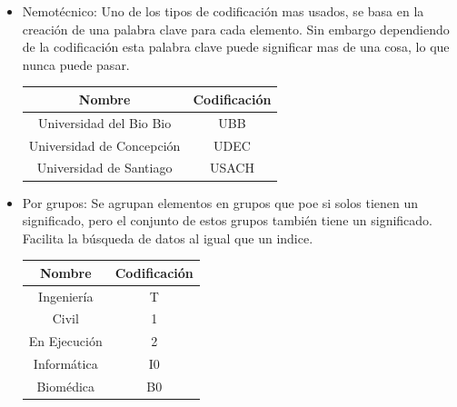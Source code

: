 \documentclass{templateNote}
\begin{document}
\begin{enumerate}
\begin{itemize}
\begin{itemize}
\begin{tcolorbox}[colback=green!10!white,colframe=green!75!black,title=Ejemplo de codificación de consonantes]
                \end{tcolorbox}
                \item Nemotécnico: Uno de los tipos de codificación mas usados, se basa en la creación de una palabra clave para cada elemento.
                Sin embargo dependiendo de la codificación esta palabra clave puede significar mas de una cosa, lo que nunca puede pasar.
                \begin{tcolorbox}[colback=green!10!white,colframe=green!75!black,title=Ejemplo de codificación Nemotécnica]
                    \begin{center}
                        \begin{tabular}{|c|c|}
                            \hline
                            \textbf{Nombre} & \textbf{Codificación} \\ \hline
                            Universidad del Bio Bio & UBB \\ \hline
                            Universidad de Concepción & UDEC \\ \hline
                            Universidad de Santiago & USACH \\ \hline
                        \end{tabular}
                    \end{center}
                \end{tcolorbox}
                \item Por grupos: Se agrupan elementos en grupos que poe si solos tienen un significado, pero el conjunto de estos grupos también tiene un significado. Facilita la búsqueda de datos al igual que un indice.
                \begin{tcolorbox}[colback=green!10!white,colframe=green!75!black,title=Ejemplo de codificación Por grupos]
                    \begin{center}
                        \begin{tabular}{|c|c|}
                            \hline
                            \textbf{Nombre} & \textbf{Codificación} \\ \hline
                            Ingeniería & T \\ \hline
                            Civil & 1 \\ \hline
                            En Ejecución & 2 \\ \hline
                            Informática & I0 \\ \hline
                            Biomédica & B0 \\ \hline

\end{tabular}
\end{center}
\end{tcolorbox}
\end{itemize}
\end{itemize}
\end{enumerate}
\end{document}
